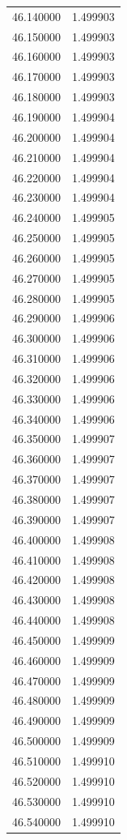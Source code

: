 \begin{tabular}{rr}
46.140000 & 1.499903 \\
46.150000 & 1.499903 \\
46.160000 & 1.499903 \\
46.170000 & 1.499903 \\
46.180000 & 1.499903 \\
46.190000 & 1.499904 \\
46.200000 & 1.499904 \\
46.210000 & 1.499904 \\
46.220000 & 1.499904 \\
46.230000 & 1.499904 \\
46.240000 & 1.499905 \\
46.250000 & 1.499905 \\
46.260000 & 1.499905 \\
46.270000 & 1.499905 \\
46.280000 & 1.499905 \\
46.290000 & 1.499906 \\
46.300000 & 1.499906 \\
46.310000 & 1.499906 \\
46.320000 & 1.499906 \\
46.330000 & 1.499906 \\
46.340000 & 1.499906 \\
46.350000 & 1.499907 \\
46.360000 & 1.499907 \\
46.370000 & 1.499907 \\
46.380000 & 1.499907 \\
46.390000 & 1.499907 \\
46.400000 & 1.499908 \\
46.410000 & 1.499908 \\
46.420000 & 1.499908 \\
46.430000 & 1.499908 \\
46.440000 & 1.499908 \\
46.450000 & 1.499909 \\
46.460000 & 1.499909 \\
46.470000 & 1.499909 \\
46.480000 & 1.499909 \\
46.490000 & 1.499909 \\
46.500000 & 1.499909 \\
46.510000 & 1.499910 \\
46.520000 & 1.499910 \\
46.530000 & 1.499910 \\
46.540000 & 1.499910 \\

\end{tabular}
